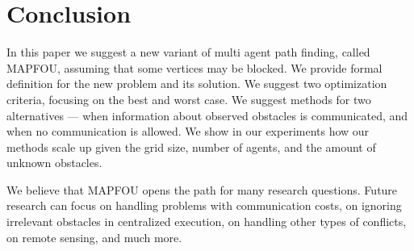 \documentclass[letterpaper]{article} %
\begin{document}
\section{Conclusion}

In this paper we suggest a new variant of multi agent path finding, called MAPFOU, assuming that some vertices may be blocked. We provide formal definition for the new problem and its solution. We suggest two optimization criteria, focusing on the best and worst case. We suggest methods for two alternatives --- when information about observed obstacles is communicated, and when no communication is allowed. We show in our experiments how our methods scale up given the grid size, number of agents, and the amount of unknown obstacles.

We believe that MAPFOU opens the path for many research questions. Future research can focus on handling problems with communication costs, on ignoring irrelevant obstacles in centralized execution, on handling other types of conflicts, on remote sensing, and much more.



        
\end{document}
